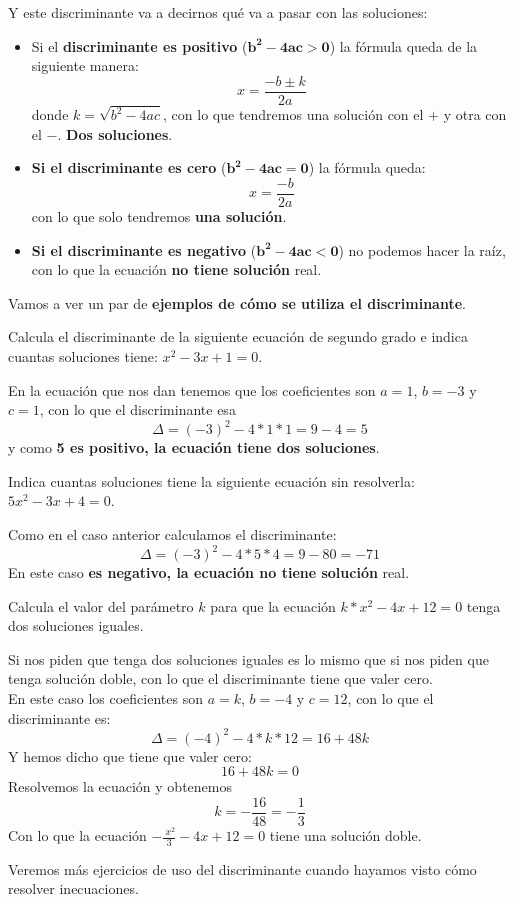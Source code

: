 \documentclass[a4paper,11pt,answers]{exam}
\begin{document}
Y este discriminante va a decirnos qué va a pasar con las soluciones:
\begin{itemize}
\item Si el \textbf{discriminante es positivo} ($\boldsymbol{b^2 -4ac > 0}$) la fórmula queda
  de la siguiente manera:
  \[x = \frac{-b \pm k}{2a}\]
  donde $k = \sqrt{b^2 - 4ac}$, con lo que tendremos una solución con el $+$ y otra con el $-$.
  \textbf{Dos soluciones}.
\item \textbf{Si el discriminante es cero} ($\boldsymbol{b^2 - 4ac = 0}$) la fórmula queda:
  \[x = \frac{-b}{2a}\]
  con lo que solo tendremos \textbf{una solución}.
\item \textbf{Si el discriminante es negativo} ($\boldsymbol{b^2 - 4ac < 0}$) no podemos hacer la raíz, con lo que la ecuación \textbf{no tiene solución} real.
\end{itemize}

Vamos a ver un par de \textbf{ejemplos de cómo se utiliza el discriminante}.
\begin{questions}
\question Calcula el discriminante de la siguiente ecuación de segundo grado e indica cuantas soluciones tiene: $x^2 - 3x + 1 = 0$.
  \begin{solution}
    En la ecuación que nos dan tenemos que los coeficientes son $a=1$, $b = -3$ y $c = 1$, con lo que el discriminante esa
    \[\Delta = (-3)^2 - 4*1*1 = 9 - 4 = 5\]
    y como \textbf{5 es positivo, la ecuación tiene dos soluciones}.
  \end{solution}
\question Indica cuantas soluciones tiene la siguiente ecuación sin resolverla: $5x^2 - 3x + 4 = 0$.
  \begin{solution}
    Como en el caso anterior calculamos el discriminante:
    \[\Delta = (-3)^2 - 4*5*4 = 9 - 80 = -71\]
    En este caso \textbf{es negativo, la ecuación no tiene solución} real.
  \end{solution}
\question Calcula el valor del parámetro $k$ para que la ecuación $k*x^2 - 4x + 12 = 0$ tenga dos soluciones iguales.
  \begin{solution}
    Si nos piden que tenga dos soluciones iguales es lo mismo que si nos piden que tenga solución doble, con lo que el discriminante tiene que valer cero.\\
    En este caso los coeficientes son $a=k$, $b= -4$ y $c=12$, con lo que el discriminante es:
    \[\Delta = (-4)^2 - 4*k*12 = 16 + 48k\]
    Y hemos dicho que tiene que valer cero:
    \[16 + 48k = 0\]
    Resolvemos la ecuación y obtenemos
    \[k = -\frac{16}{48} = -\frac{1}{3}\]
    Con lo que la ecuación $-\frac{\ x^2}{3} - 4x + 12 = 0$ tiene una solución doble.
  \end{solution} 
\end{questions}
Veremos más ejercicios de uso del discriminante cuando hayamos visto cómo resolver inecuaciones.
\end{document}
